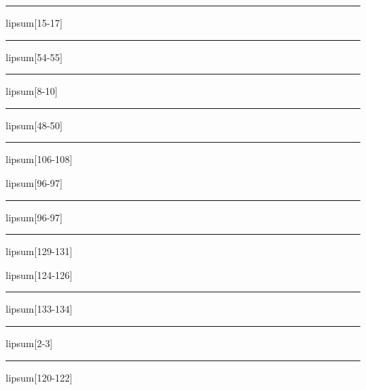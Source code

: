 \documentclass[11pt,a4paper]{article}
\begin{document}
\begin{simplewrap}
  \textcolor{blue!44}{\rule{5.7cm}{5.7cm}}
\end{simplewrap}
lipsum[15-17]

\begin{simplewrap}
  \textcolor{violet!46}{\rule{5.2cm}{4.5cm}}
\end{simplewrap}
lipsum[54-55]

\begin{simplewrap}
  \textcolor{brown!60}{\rule{4.1cm}{9.8cm}}
\end{simplewrap}
lipsum[8-10]

\begin{simplewrap}
  \textcolor{pink!50}{\rule{4.6cm}{3.3cm}}
\end{simplewrap}
lipsum[48-50]

\begin{simplewrap}
  \textcolor{violet!55}{\rule{5.6cm}{7.7cm}}
\end{simplewrap}
lipsum[106-108]

lipsum[96-97]

\begin{simplewrap}
  \textcolor{blue!29}{\rule{3.6cm}{4.4cm}}
\end{simplewrap}
lipsum[96-97]

\begin{simplewrap}
  \textcolor{yellow!15}{\rule{4.3cm}{2.2cm}}
\end{simplewrap}
lipsum[129-131]

lipsum[124-126]

\begin{simplewrap}
  \textcolor{cyan!29}{\rule{5.3cm}{3.1cm}}
\end{simplewrap}
lipsum[133-134]

\begin{simplewrap}
  \textcolor{purple!23}{\rule{5.2cm}{5.7cm}}
\end{simplewrap}
lipsum[2-3]

\begin{simplewrap}
  \textcolor{blue!53}{\rule{5.5cm}{9.0cm}}
\end{simplewrap}
lipsum[120-122]
\end{document}
